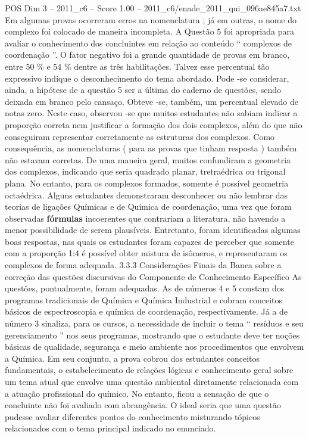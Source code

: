 \begin{textsample}{POS Dim 3 – 2011\_c6 – Score 1.00 – 2011\_c6/enade\_2011\_qui\_096ae845a7.txt}
Em algumas provas ocorreram erros na nomenclatura ; já em outras, o nome do complexo foi colocado de maneira incompleta.
A Questão 5 foi apropriada para avaliar o conhecimento dos concluintes em relação ao conteúdo “ complexos de coordenação ”.
O fator negativo foi a grande quantidade de provas em branco, entre 50 \% e 54 \% dentre as três habilitações.
Talvez esse percentual tão expressivo indique o desconhecimento do tema abordado.
Pode -se considerar, ainda, a hipótese de a questão 5 ser a última do caderno de questões, sendo deixada em branco pelo cansaço.
Obteve -se, também, um percentual elevado de notas zero.
Neste caso, observou -se que muitos estudantes não sabiam indicar a proporção correta nem justificar a formação dos dois complexos, além do que não conseguiram representar corretamente as estruturas dos complexos.
Como consequência, as nomenclaturas ( para as provas que tinham resposta ) também não estavam corretas.
De uma maneira geral, muitos confundiram a geometria dos complexos, indicando que seria quadrado planar, tretraédrica ou trigonal plana.
No entanto, para os complexos formados, somente é possível geometria octaédrica.
Alguns estudantes demonstraram desconhecer ou não lembrar das teorias de ligações Químicas e de Química de coordenação, uma vez que foram observadas \textbf{fórmulas} incoerentes que contrariam a literatura, não havendo a menor possibilidade de serem plausíveis.
Entretanto, foram identificadas algumas boas respostas, nas quais os estudantes foram capazes de perceber que somente com a proporção 1:4 é possível obter mistura de isômeros, e representaram os complexos de forma adequada. 3.3.3 Considerações Finais da Banca sobre a correção das questões discursivas do Componente de Conhecimento Específico As questões, pontualmente, foram adequadas.
As de números 4 e 5 constam dos programas tradicionais de Química e Química Industrial e cobram conceitos básicos de espectroscopia e química de coordenação, respectivamente.
Já a de número 3 sinaliza, para os cursos, a necessidade de incluir o tema “ resíduos e seu gerenciamento ” nos seus programas, mostrando que o estudante deve ter noções básicas de qualidade, segurança e meio ambiente nos procedimentos que envolvem a Química.
Em seu conjunto, a prova cobrou dos estudantes conceitos fundamentais, o estabelecimento de relações lógicas e conhecimento geral sobre um tema atual que envolve uma questão ambiental diretamente relacionada com a atuação profissional do químico.
No entanto, ficou a sensação de que o concluinte não foi avaliado com abrangência.
O ideal seria que uma questão pudesse avaliar diferentes pontos do conhecimento misturando tópicos relacionados com o tema principal indicado no enunciado.

\end{textsample}
